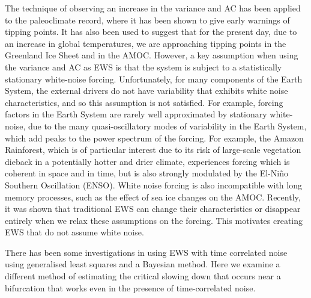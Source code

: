 The technique of observing an increase in the variance and
AC has been applied to the paleoclimate record, where it has been shown to give early
warnings of tipping points\cite{Boers2018a}. It has also been used to 
suggest that for the present day, due to an increase in global temperatures, we are approaching tipping points in 
the Greenland Ice Sheet\cite{Boers2021} and in the AMOC\cite{Boers2021a}.	
However, a key assumption when using the variance and AC as EWS is that the system is subject to a statistically stationary white-noise forcing. Unfortunately, for many
components of the Earth System, the external drivers do not have variability that exhibits white noise characteristics, and
so this assumption is not satisfied. For example, forcing factors in the Earth System are rarely well approximated by stationary white-noise, due to the many quasi-oscillatory modes
of variability in the Earth System\cite{VonderHeydt2021}, which add peaks
to the power spectrum of the forcing. For example, the Amazon
Rainforest, which is of particular interest due to its risk of large-scale vegetation dieback in a potentially hotter and drier
climate, experiences
forcing which is coherent in space and in time, but is also strongly modulated by the
El-Ni\~{n}o Southern Oscillation (ENSO)\cite{Jimenez-Munoz2016}.
White noise forcing is also incompatible with
long memory processes\cite{Hurst1957}, such as the effect of sea ice changes on the AMOC\cite{Kuehn2021}. Recently, it was shown\cite{Kuehn2021}
that traditional EWS  can change their characteristics or disappear entirely when we relax these assumptions on the forcing. This motivates creating EWS that do not assume white noise.


There has been some investigations in using EWS with time correlated noise using generalised least squares\cite{Boers2021a,Boettner2022} and a Bayesian method\cite{hessler2022,Hessler2022b}. Here we examine a 
different method of estimating the critical slowing down that occurs near
a bifurcation that works even in the presence of time-correlated noise.

